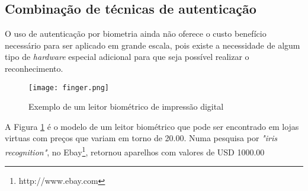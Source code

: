 \subsection{Combinação de técnicas de autenticação}
O uso de autenticação por biometria ainda não oferece o custo benefício necessário para ser aplicado em grande escala, pois existe a necessidade de algum tipo de \textit{hardware} especial adicional para que seja possível realizar o reconhecimento.

\begin{figure}[!htb]
	\centering
	\texttt{[image: finger.png]}
	\small
	\caption[Exemplo de um leitor biométrico de impressão digital]{Exemplo de um leitor biométrico de impressão digital}
	\label{fig:finger}
\end{figure}

A Figura \ref{fig:finger} é o modelo de um leitor biométrico que pode ser encontrado em lojas virtuas com preços que variam em torno de 20.00. Numa pesquisa por \textit{"iris recognition"}, no Ebay\footnote{http://www.ebay.com}, retornou aparelhos com valores de USD 1000.00